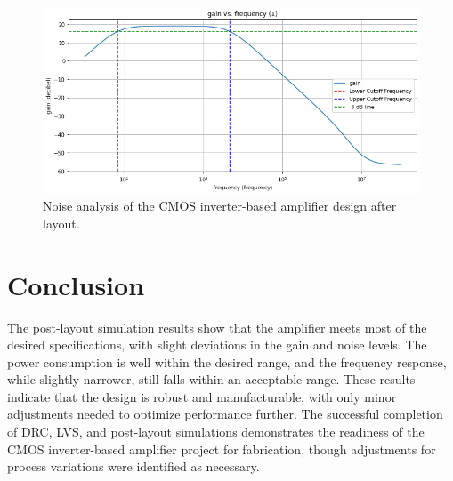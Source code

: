 \begin{figure}[ht!]
    \centering
    \includegraphics[width=\textwidth]{Figures/post_layout_frequency_response.png}
    \caption{Noise analysis of the CMOS inverter-based amplifier design after layout.}
    \label{fig:post_layout_noise}
\end{figure}

\section{Conclusion}
The post-layout simulation results show that the amplifier meets most of the desired specifications, with slight deviations in the gain and noise levels. 
The power consumption is well within the desired range, and the frequency response, while slightly narrower, still falls within an acceptable range. 
These results indicate that the design is robust and manufacturable, with only minor adjustments needed to optimize performance further. 
The successful completion of DRC, LVS, and post-layout simulations demonstrates the readiness of the CMOS inverter-based amplifier project for fabrication, though adjustments for process variations were identified as necessary. 